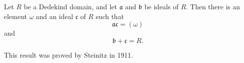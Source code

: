 \documentclass[12pt]{article}
\begin{document}
Let $R$ be a Dedekind domain,
and let $\mathfrak{a}$ and $\mathfrak{b}$ be ideals of $R$.
Then there is an element $\omega$ and an ideal $\mathfrak{c}$ of $R$ such that
$$\mathfrak{ac} = (\omega)$$
and
$$\mathfrak{b+c} = R.$$

This result was proved by Steinitz in 1911.
\end{document}

